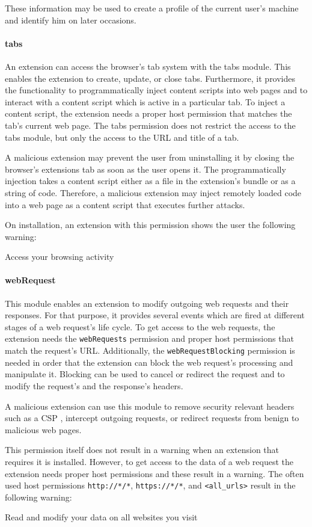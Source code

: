 	These information may be used to create a profile of the current user's machine and identify him on later occasions.
	
\paragraph{tabs}
	An extension can access the browser's tab system with the tabs module. This enables the extension to create, update, or close tabs. Furthermore, it provides the functionality to programmatically inject content scripts into web pages and to interact with a content script which is active in a particular tab. To inject a content script, the extension needs a proper host permission that matches the tab's current web page. The tabs permission does not restrict the access to the tabs module, but only the access to the URL and title of a tab. 
	
	A malicious extension may prevent the user from uninstalling it by closing the browser's extensions tab as soon as the user opens it. The programmatically injection takes a content script either as a file in the extension's bundle or as a string of code. Therefore, a malicious extension may inject remotely loaded code into a web page as a content script that executes further attacks.
	
	On installation, an extension with this permission shows the user the following warning:
	\begin{permissionwarning}
		Access your browsing activity 
	\end{permissionwarning}		
	
\paragraph{webRequest}

	This module enables an extension to modify outgoing web requests and their responses. For that purpose, it provides several events which are fired at different stages of a web request's life cycle. To get access to the web requests, the extension needs the \texttt{webRequests} permission and proper host permissions that match the request's URL. Additionally, the \texttt{webRequestBlocking} permission is needed in order that the extension can block the web request's processing and manipulate it. Blocking can be used to cancel or redirect the request and to modify the request's and the response's headers. 
	
	A malicious extension can use this module to remove security relevant headers such as a CSP , intercept outgoing requests, or redirect requests from benign to malicious web pages.
	
	This permission itself does not result in a warning when an extension that requires it is installed. However, to get access to the data of a web request the extension needs proper host permissions and these result in a warning. The often used host permissions \texttt{http://*/*}, \texttt{https://*/*}, and \texttt{<all\_urls>} result in the following warning:
	\begin{permissionwarning}
		Read and modify your data on all websites you visit 
	\end{permissionwarning}
	
